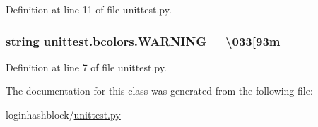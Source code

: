 Definition at line 11 of file unittest.\+py.

\subsubsection[{\texorpdfstring{W\+A\+R\+N\+I\+NG}{WARNING}}]{\setlength{\rightskip}{0pt plus 5cm}string unittest.\+bcolors.\+W\+A\+R\+N\+I\+NG = \textquotesingle{}\textbackslash{}033\mbox{[}93m\textquotesingle{}\hspace{0.3cm}{\ttfamily [static]}}\hypertarget{classunittest_1_1bcolors_acc0c1f9b572e877f80e4017094d3de68}{}\label{classunittest_1_1bcolors_acc0c1f9b572e877f80e4017094d3de68}


Definition at line 7 of file unittest.\+py.



The documentation for this class was generated from the following file\+:\begin{DoxyCompactItemize}
\item 
loginhashblock/\hyperlink{unittest_8py}{unittest.\+py}\end{DoxyCompactItemize}
